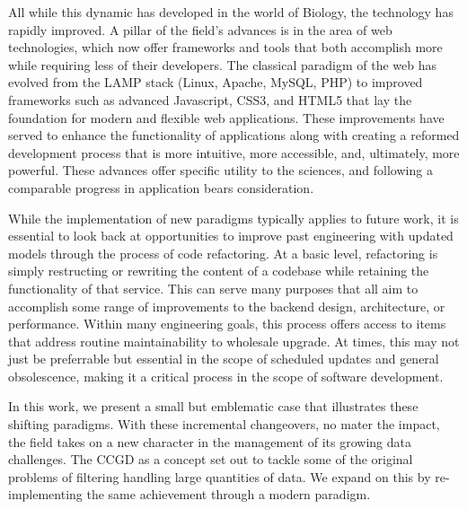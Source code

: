 \documentclass[10pt]{report}
\begin{document}
All while this dynamic has developed in the world of Biology, the technology has rapidly improved. A pillar of the field's advances is in the area of web technologies, which now offer frameworks and tools that both accomplish more while requiring less of their developers. The classical paradigm of the web has evolved from the LAMP stack (Linux, Apache, MySQL, PHP) to improved frameworks such as advanced Javascript, CSS3, and HTML5 that lay the foundation for modern and flexible web applications. These improvements have served to enhance the functionality of applications along with creating a reformed development process that is more intuitive, more accessible, and, ultimately, more powerful. These advances offer specific utility to the sciences, and following a comparable progress in application bears consideration.

While the implementation of new paradigms typically applies to future work, it is essential to look back at opportunities to improve past engineering with updated models through the process of code refactoring. At a basic level, refactoring is simply restructing or rewriting the content of a codebase while retaining the functionality of that service. This can serve many purposes that all aim to accomplish some range of improvements to the backend design, architecture, or performance. Within many engineering goals, this process offers access to items that address routine maintainability to wholesale upgrade. At times, this may not just be preferrable but essential in the scope of scheduled updates and general obsolescence, making it a critical process in the scope of software development.

In this work, we present a small but emblematic case that illustrates these shifting paradigms. With these incremental changeovers, no mater the impact, the field takes on a new character in the management of its growing data challenges. The CCGD as a concept set out to tackle some of the original problems of filtering handling large quantities of data. We expand on this by re-implementing the same achievement through a modern paradigm.


\end{document}
